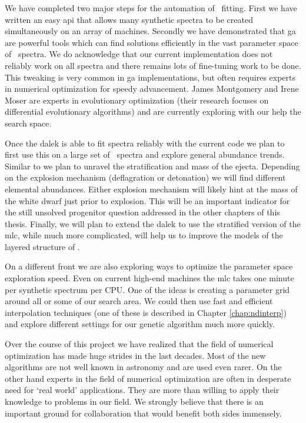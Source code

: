 We have completed two major steps for the automation of \sneia\ fitting. First we have written an easy \gls{api} that allows many synthetic spectra to be created simultaneously on an array of machines. Secondly we have demonstrated that \gls{ga} are powerful tools which can find solutions efficiently in the vast parameter space of \sneia\ spectra. We do acknowledge that our current implementation does not reliably work on all spectra and there remains lots of fine-tuning work to be done. This tweaking is very common in \gls{ga} implementations, but often requires experts in numerical optimization for speedy advancement. James Montgomery and Irene Moser are experts in evolutionary optimization (their research focuses on differential evolutionary algorithms) and are currently exploring with our help the search space. 

Once the \gls{dalek} is able to fit spectra reliably with the current code we plan to first use this on a large set of \sneia\ spectra and explore general abundance trends. Similar to \citet{2007Sci...315..825M} we plan to unravel the stratification and mass of the ejecta. Depending on the explosion mechanism (deflagration or detonation) we will find different elemental abundances. Either explosion mechanism will likely hint at the mass of the white dwarf just prior to explosion. This will be an important indicator for the still unsolved progenitor question addressed in the other chapters of this thesis. Finally, we will plan to extend the \gls{dalek} to use the stratified version of the \gls{mlc}, while much more complicated,  will help us to improve the models of the layered structure of \snia.

On a different front we are also exploring ways to optimize the parameter space exploration speed. Even on current high-end machines the \gls{mlc} takes one minute per synthetic spectrum per CPU. One of the ideas is creating a parameter grid around all or some of our search area. We could then use fast and efficient interpolation techniques (one of these is described in Chapter \ref{chap:ndinterp}) and explore different settings for our genetic algorithm much more quickly.

Over the course of this project we have realized that the field of numerical optimization has made huge strides in the last decades. Most of the new algorithms are not well known in astronomy and are used even rarer. On the other hand experts in the field of numerical optimization are often in desperate need for `real world' applications. They are more than willing to apply their knowledge to problems in our field. We strongly believe that there is an important ground for collaboration that would benefit both sides immensely.





